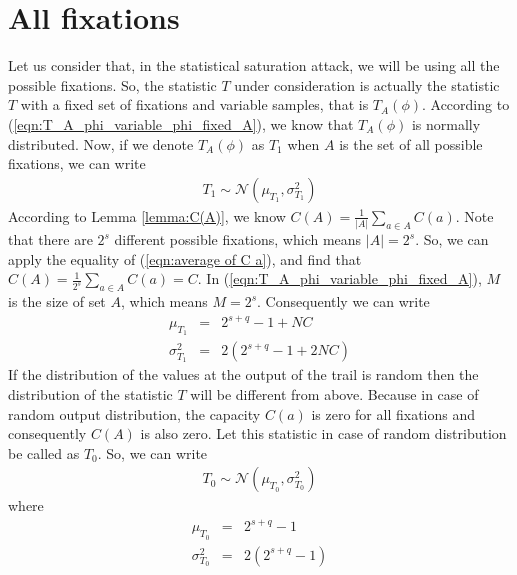 \iffalse
\section{All fixations}
Let us consider that, in the statistical saturation attack, we will be using all the possible fixations. So, the statistic $T$ under consideration is actually the statistic $T$ with a fixed set of fixations and variable samples, that is $T_{A}(\phi)$. According to (\ref{eqn:T_A_phi_variable_phi_fixed_A}), we know that $T_{A}\left(\phi\right)$ is normally distributed. Now, if we denote $T_{A}\left(\phi\right)$ as $T_1$ when $A$ is the set of all possible fixations, we can write  
\begin{eqnarray}
T_1 \sim \mathcal{N}\left(\mu_{T_1},\sigma^2_{T_1}\right)
\end{eqnarray} 
According to Lemma \ref{lemma:C(A)}, we know $C\left(A\right) = \frac{1}{\lvert A \rvert}\displaystyle\sum_{a \in A}C\left(a\right)$. Note that there are $2^s$ different possible fixations, which means $\lvert A \rvert = 2^s$. So, we can apply the equality of (\ref{eqn:average of C a}), and find that  $C\left(A\right) = \frac{1}{2^s}\displaystyle\sum_{a \in A}C\left(a\right) = C$. In (\ref{eqn:T_A_phi_variable_phi_fixed_A}), $M$ is the size of set $A$, which means $M = 2^s$. Consequently we can write   
\begin{eqnarray}
\mu_{T_1} &=& 2^{s+q} - 1 + NC \label{eqn:mean_T_1}\\
\sigma^2_{T_1} &=& 2(2^{s+q} - 1 + 2NC) \label{eqn:variance_T_1}
\end{eqnarray}
If the distribution of the values at the output of the trail is random then the distribution of the statistic $T$ will be different from above. Because in case of random  output distribution, the capacity $C\left(a\right)$ is zero for all fixations and consequently $C\left(A\right)$ is also zero. Let this statistic in case of random distribution be called as $T_0$. So, we can write 
\begin{eqnarray}
T_0 \sim \mathcal{N}\left( \mu_{T_0} , \sigma^2_{T_0}  \right)
\end{eqnarray} where 
\begin{eqnarray}
\mu_{T_0} &=& 2^{s+q} - 1 \label{eqn:mean_T_0}\\
\sigma^2_{T_0} &=& 2(2^{s+q} - 1) \label{eqn:variance_T_0}
\end{eqnarray}

